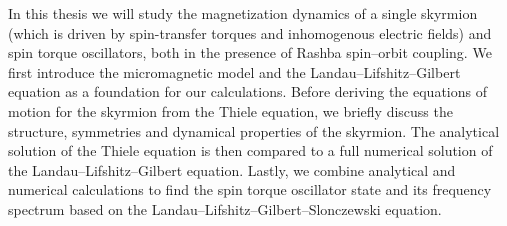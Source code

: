 In this thesis we will study the magnetization dynamics of a single skyrmion (which is driven by spin-transfer torques and inhomogenous electric fields) and spin torque oscillators, both in the presence of Rashba spin--orbit coupling. We first introduce the micromagnetic model and the Landau--Lifshitz--Gilbert equation as a foundation for our calculations. Before deriving the equations of motion for the skyrmion from the Thiele equation, we briefly discuss the structure, symmetries and dynamical properties of the skyrmion. The analytical solution of the Thiele equation is then compared to a full numerical solution of the Landau--Lifshitz--Gilbert equation. Lastly, we combine analytical and numerical calculations to find the spin torque oscillator state and its frequency spectrum based on the Landau--Lifshitz--Gilbert--Slonczewski equation. 